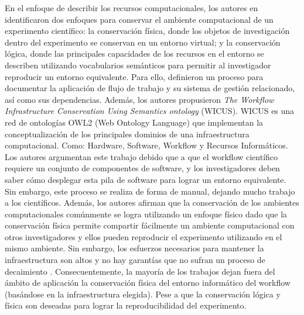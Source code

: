 En el enfoque de describir los recursos computacionales, los autores en \cite{santana2017reproducibility} identificaron dos enfoques para conservar el  ambiente computacional de un experimento científico: la conservación física, donde los objetos de investigación dentro del experimento se conservan en un entorno virtual; y la conservación lógica, donde las principales capacidades de los recursos en el entorno se describen utilizando vocabularios semánticos para permitir al investigador reproducir un entorno equivalente. Para ello, definieron un proceso para documentar la aplicación de flujo de trabajo y su sistema de gestión relacionado, así como sus dependencias. Además, los autores propusieron \textit{The Workflow Infrastructure Conservation Using Semantics ontology} (WICUS). WICUS es una red de ontologías OWL2 (Web Ontology Language) que implementan la conceptualización de los principales dominios de una infraestructura computacional. Como: Hardware, Software, Workflow y Recursos Informáticos. 
Los autores argumentan este trabajo debido que a que el workflow científico requiere un conjunto de componentes de software, y los investigadores deben saber cómo desplegar esta pila de software para lograr un entorno equivalente.
Sin embargo, este proceso se realiza de forma de manual, dejando mucho trabajo a los científicos. 
Además, los autores afirman que la conservación de los ambientes computacionales comúnmente se logra utilizando un enfoque físico dado que la conservación física permite compartir fácilmente un ambiente computacional con otros investigadores y ellos pueden reproducir el experimento utilizando en el mismo ambiente. 
Sin embargo, los esfuerzos necesarios para mantener la infraestructura son altos y no hay garantías que no sufran un proceso de decaimiento \cite{DBLP:journals/fgcs/DeelmanVJRCMMCS15}.  
Consecuentemente, la mayoría de los trabajos dejan fuera del ámbito de aplicación la conservación física del entorno informático del workflow (basándose en la infraestructura elegida). Pese a que la conservación lógica y física son deseadas para lograr la reproducibilidad del experimento. 

